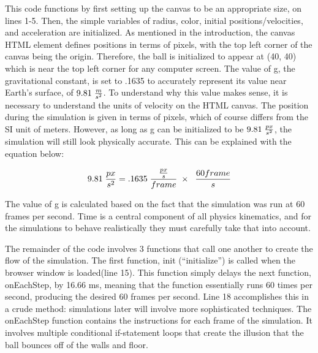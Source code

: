 This code functions by first setting up the canvas to be an appropriate size, on lines 1-5.  Then, the simple variables of radius, color, initial positions/velocities, and acceleration are initialized.  As mentioned in the introduction, the canvas HTML element defines positions in terms of pixels, with the top left corner of the canvas being the origin.  Therefore, the ball is initialized to appear at (40, 40) which is near the top left corner for any computer screen.  The value of g, the gravitational constant, is set to .1635 to accurately represent its value near Earth's surface, of $9.81 \hspace{1mm} \frac{m}{s^2}$.  To understand why this value makes sense, it is necessary to understand the units of velocity on the HTML canvas.  The position during the simulation is given in terms of pixels, which of course differs from the SI unit of meters.  However, as long as g can be initialized to be $9.81 \hspace{1mm} \frac{px}{s^2}$, the simulation will still look physically accurate.  This can be explained with the equation below:

\begin{equation} \label{eq:pixelsconversion}
9.81 \hspace{1mm}  \frac{px}{s^2}  = .1635 \hspace{1mm}  \frac{\frac{px}{s}}{frame} \hspace{1mm}  \times \hspace{1mm}  \hspace{1mm}  \frac{60 frame}{s}
\end{equation}


The value of g is calculated based on the fact that the simulation was run at 60 frames per second.  Time is a central component of all physics kinematics, and for the simulations to behave realistically they must carefully take that into account.  

The remainder of the code involves 3 functions that call one another to create the flow of the simulation.  The first function, init (``initialize'') is called when the browser window is loaded(line 15).  This function simply delays the next function, onEachStep, by 16.66 ms, meaning that the function essentially runs 60 times per second, producing the desired 60 frames per second.  Line 18 accomplishes this in a crude method: simulations later will involve more sophisticated techniques.  The onEachStep function contains the instructions for each frame of the simulation.  It involves multiple conditional if-statement loops that create the illusion that the ball bounces off of the walls and floor.  

